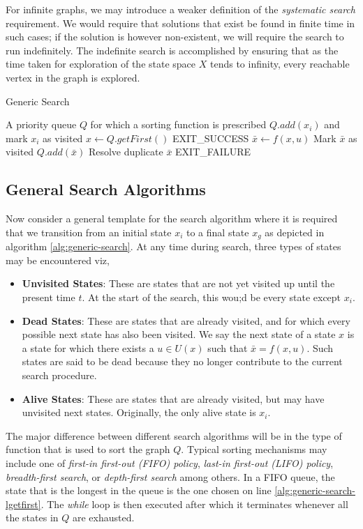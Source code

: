 For infinite graphs, we may introduce a weaker definition of the \textit{systematic search} requirement. We would require that solutions that exist be found in finite time in such cases; if the solution is however non-existent, we will require the search to run indefinitely. The indefinite search is accomplished by ensuring that as the time taken for exploration of the state space $X$ tends to infinity, every reachable vertex in the graph is explored.
%
\begin{algorithm}[tbph!]
	\begin{algorithmic}[1]
		\caption{Generic Search}
		\Require A priority queue $Q$ for which a sorting function is prescribed
		\State $Q.add(x_i)$ and mark $x_i$ as visited
		\State $x\leftarrow Q.getFirst()$ \label{alg:generic-search-lgetfirst}
		\State \Return EXIT\_SUCCESS
		\EndIf
		\State $\bar{x} \leftarrow f(x, u)$
		\State Mark $\bar{x}$ as visited
		\State $Q.add(\bar{x})$
		\Else
		\State Resolve duplicate $\bar{x}$
		\EndIf
		\EndFor
		\EndWhile 
		\State \Return EXIT\_FAILURE
	\end{algorithmic}
\label{alg:generic-search}
\end{algorithm}
%
\subsection{General Search Algorithms}
Now consider a general template for the search algorithm where it is required that we transition from an initial state $x_i$ to a final state $x_g$ as depicted in algorithm \ref{alg:generic-search}. At any time during search, three types of states may be encountered viz,
%
\begin{itemize}
	\item \textbf{Unvisited States}: These are states that are not yet visited up until the present time $t$. At the start of the search, this wou;d be every state except $x_i$.
	\item \textbf{Dead States}: These are states that are already visited, and for which every possible next state has also been visited. We say the next state of a state $x$ is a state for which there exists a $u \in U(x)$ such that $\bar{x} = f(x, u)$. Such states are said to be dead because they no longer contribute to the current search procedure.
	\item \textbf{Alive States}: These are states that are already visited, but may have unvisited next states. Originally, the only alive state is $x_i$.
\end{itemize}

The major difference between different search algorithms will be in the type of function that is used to sort the graph $Q$. Typical sorting mechanisms may include one of \textit{first-in first-out (FIFO) policy}, \textit{last-in first-out (LIFO) policy}, \textit{breadth-first search}, or \textit{depth-first search} among others. In a FIFO queue, the state that is the longest in the queue is the one chosen on line \ref{alg:generic-search-lgetfirst}.  The \textit{while} loop is then executed after which it terminates whenever all the states in $Q$ are exhausted. 